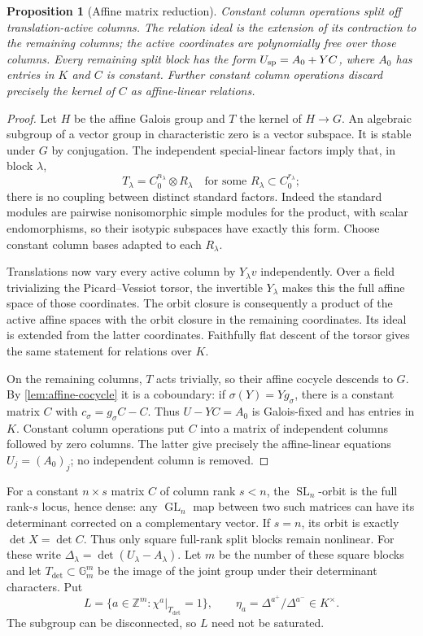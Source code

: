 \documentclass[11pt]{article}
\numberwithin{equation}{section}
\newtheorem{proposition}[proposition]{Proposition}
\theoremstyle{definition}
\theoremstyle{remark}
\newcommand{\Z}{\mathbb Z}
\newcommand{\Gm}{\mathbb G_m}
\newcommand{\SL}{\operatorname{SL}}
\newcommand{\GL}{\operatorname{GL}}
\begin{document}
\begin{proposition}[Affine matrix reduction]\label{prop:affine-reduction}
Constant column operations split off translation-active columns. The
relation ideal is the extension of its contraction to the remaining
columns; the active coordinates are polynomially free over those columns.
Every remaining split block has the form $U_{\rm sp}=A_0+YC$, where
$A_0$ has entries in $K$ and $C$ is constant. Further constant column
operations discard precisely the kernel of $C$ as affine-linear relations.
\end{proposition}
\begin{proof}
Let $H$ be the affine Galois group and $T$ the kernel of $H\to G$.
An algebraic subgroup of a vector group in characteristic zero is a
vector subspace. It is stable under $G$ by conjugation. The independent
special-linear factors imply that, in block $\lambda$,
\[
 T_\lambda=C_0^{n_\lambda}\otimes R_\lambda
 \quad\text{for some }R_\lambda\subset C_0^{r_\lambda};
\]
there is no coupling between distinct standard factors. Indeed the
standard modules are pairwise nonisomorphic simple modules for the
product, with scalar endomorphisms, so their isotypic subspaces have
exactly this form. Choose constant column bases adapted to each
$R_\lambda$.

Translations now vary every active column by $Y_\lambda v$
independently. Over a field trivializing the Picard--Vessiot torsor,
the invertible $Y_\lambda$ makes this the full affine space of those
coordinates. The orbit closure is consequently a product of the active
affine spaces with the orbit closure in the remaining coordinates.
Its ideal is extended from the latter coordinates. Faithfully flat
descent of the torsor gives the same statement for relations over $K$.

On the remaining columns, $T$ acts trivially, so their affine cocycle
descends to $G$. By \cref{lem:affine-cocycle} it is a coboundary:
if $\sigma(Y)=Yg_\sigma$, there is a constant matrix $C$ with
$c_\sigma=g_\sigma C-C$. Thus $U-YC=A_0$ is Galois-fixed and has
entries in $K$. Constant column operations put $C$ into a matrix of
independent columns followed by zero columns. The latter give precisely
the affine-linear equations $U_j=(A_0)_j$; no independent column is
removed.
\end{proof}

For a constant $n\times s$ matrix $C$ of column rank $s<n$, the
$\SL_n$-orbit is the full rank-$s$ locus, hence dense: any $\GL_n$ map
between two such matrices can have its determinant corrected on a
complementary vector. If $s=n$, its orbit is exactly
$\det X=\det C$. Thus only square full-rank split blocks remain nonlinear.
For these write $\Delta_\lambda=\det(U_\lambda-A_\lambda)$.
Let $m$ be the number of these square blocks and let
$T_{\det}\subset\Gm^m$ be the image of the joint group under their
determinant characters. Put
\[
 L=\{a\in\Z^m:\chi^a|_{T_{\det}}=1\},\qquad
 \eta_a=\Delta^{a^+}/\Delta^{a^-}\in K^\times.
\]
The subgroup can be disconnected, so $L$ need not be saturated.
\end{document}
